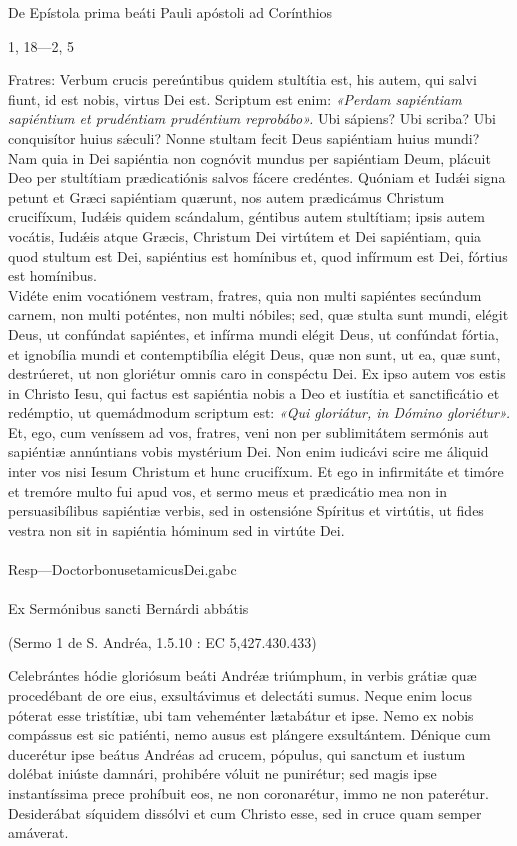 \documentclass[options]{article}
\begin{document}
	De Epístola prima beáti Pauli apóstoli ad Corínthios
	\begin{flushright}
		1, 18—2, 5
	\end{flushright}
Fratres: Verbum crucis pereúntibus quidem stultítia est, his autem, qui salvi fiunt, id est nobis, virtus Dei est. Scriptum est enim:
\emph{«Perdam sapiéntiam sapiéntium et prudéntiam prudéntium reprobábo».}
Ubi sápiens? Ubi scriba? Ubi conquisítor huius s\'{æ}culi? Nonne stultam fecit Deus sapiéntiam huius mundi? Nam quia in Dei sapiéntia non cognóvit mundus per sapiéntiam Deum, plácuit Deo per stultítiam prædicatiónis salvos fácere credéntes. Quóniam et Iud\'{æ}i signa petunt et Græci sapiéntiam quærunt, nos autem prædicámus Christum crucifíxum, Iud\'{æ}is quidem scándalum, géntibus autem stultítiam; ipsis autem vocátis, Iud\'{æ}is atque Græcis, Christum Dei virtútem et Dei sapiéntiam, quia quod stultum est Dei, sapiéntius est homínibus et, quod infírmum est Dei, fórtius est homínibus.\\
Vidéte enim vocatiónem vestram, fratres, quia non multi sapiéntes secúndum carnem, non multi poténtes, non multi nóbiles; sed, quæ stulta sunt mundi, elégit Deus, ut confúndat sapiéntes, et infírma mundi elégit Deus, ut confúndat fórtia, et ignobília mundi et contemptibília elégit Deus, quæ non sunt, ut ea, quæ sunt, destrúeret, ut non gloriétur omnis caro in conspéctu Dei. Ex ipso autem vos estis in Christo Iesu, qui factus est sapiéntia nobis a Deo et iustítia et sanctificátio et redémptio, ut quemádmodum scriptum est: \emph{«Qui gloriátur, in Dómino gloriétur».}\\
Et, ego, cum veníssem ad vos, fratres, veni non per sublimitátem sermónis aut sapiéntiæ annúntians vobis mystérium Dei. Non enim iudicávi scire me áliquid inter vos nisi Iesum Christum et hunc crucifíxum. Et ego in infirmitáte et timóre et tremóre multo fui apud vos, et sermo meus et prædicátio mea non in persuasibílibus sapiéntiæ verbis, sed in ostensióne Spíritus et virtútis, ut fides vestra non sit in sapiéntia hóminum sed in virtúte Dei.\\
\\
 Resp—DoctorbonusetamicusDei.gabc\\
\\
Ex Sermónibus sancti Bernárdi abbátis
\begin{flushright}
	(Sermo 1 de S. Andréa, 1.5.10 : EC 5,427.430.433)
\end{flushright}
Celebrántes hódie gloriósum beáti Andréæ triúmphum, in verbis grátiæ quæ procedébant de ore eius, exsultávimus et delectáti sumus. Neque enim locus póterat esse tristítiæ, ubi tam veheménter lætabátur et ipse. Nemo ex nobis compássus est sic patiénti, nemo ausus est plángere exsultántem. Dénique cum ducerétur ipse beátus Andréas ad crucem, pópulus, qui sanctum et iustum dolébat iniúste damnári, prohibére vóluit ne punirétur; sed magis ipse instantíssima prece prohíbuit eos, ne non coronarétur, immo ne non paterétur. Desiderábat síquidem dissólvi et cum Christo esse, sed in cruce quam semper amáverat.\\\\
\end{document}
